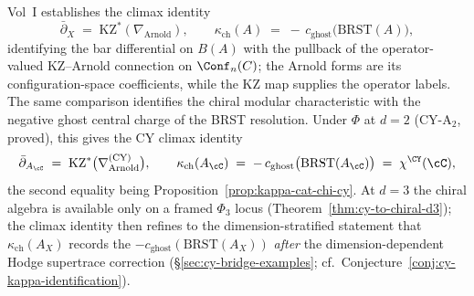 \begin{remark}[Bridge to Vol~I climax \textup{(}\texorpdfstring{$\bar\partial = \mathrm{KZ}^*(\nabla_{\mathrm{Arnold}})$}{bard = KZ-*(nabla-Arnold)}, \texorpdfstring{$\kappa_{\mathrm{ch}} = -c_{\mathrm{ghost}}(\mathrm{BRST})$}{kappa-ch = -c-ghost(BRST)}\textup{)}]
\label{rem:modular-koszul-bridge-climax}
Vol~I \cite{VolI} establishes the climax identity
\[
 \bar\partial_X \;=\; \mathrm{KZ}^*(\nabla_{\mathrm{Arnold}}), \qquad
 \kappa_{\mathrm{ch}}(A) \;=\; -\,c_{\mathrm{ghost}}\bigl(\mathrm{BRST}(A)\bigr),
\]
identifying the bar differential on $B(A)$ with the pullback of the
operator-valued KZ--Arnold connection on $\Conf_n(C)$; the Arnold
forms are its configuration-space coefficients, while the KZ map
supplies the operator labels. The same comparison identifies the
chiral modular characteristic with the negative ghost central charge of
the BRST resolution. Under $\Phi$ at $d = 2$ \textup{(}CY-A$_2$, proved\textup{),} this gives the CY climax identity
\[
 \bar\partial_{A_\cC} \;=\; \mathrm{KZ}^*\bigl(\nabla_{\mathrm{Arnold}}^{(\mathrm{CY})}\bigr), \qquad
 \kappa_{\mathrm{ch}}(A_\cC) \;=\; -\,c_{\mathrm{ghost}}\bigl(\mathrm{BRST}(A_\cC)\bigr) \;=\; \chi^{\CY}(\cC),
\]
the second equality being Proposition~\ref{prop:kappa-cat-chi-cy}. At $d = 3$ the chiral algebra is available only on a framed $\Phi_3$ locus \textup{(}Theorem~\ref{thm:cy-to-chiral-d3}\textup{);} the climax identity then refines to the dimension-stratified statement that $\kappa_{\mathrm{ch}}(A_X)$ records the $-c_{\mathrm{ghost}}(\mathrm{BRST}(A_X))$ \emph{after} the dimension-dependent Hodge supertrace correction \textup{(}\S\ref{sec:cy-bridge-examples}; cf.\ Conjecture~\ref{conj:cy-kappa-identification}\textup{).}
\end{remark}

